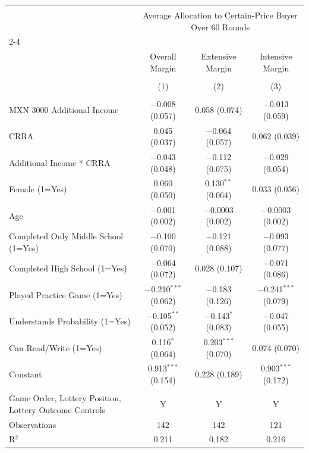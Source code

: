 
\begin{table}[!htbp] \centering 
   
   
\begin{tabular}{@{\extracolsep{5pt}}lccc} 
\\[-1.8ex]\hline 
\hline \\[-1.8ex] 
 & \multicolumn{3}{c}{Average Allocation to Certain-Price Buyer Over 60 Rounds} \\ 
\cline{2-4} 
\\[-1.8ex] & Overall Margin & Extensive Margin & Intensive Margin \\ 
\\[-1.8ex] & (1) & (2) & (3)\\ 
\hline \\[-1.8ex] 
 MXN 3000 Additional Income & $-$0.008 (0.057) & 0.058 (0.074) & $-$0.013 (0.059) \\ 
  CRRA & 0.045 (0.037) & $-$0.064 (0.057) & 0.062 (0.039) \\ 
  Additional Income * CRRA & $-$0.043 (0.048) & $-$0.112 (0.075) & $-$0.029 (0.054) \\ 
  Female (1=Yes) & 0.060 (0.050) & 0.130$^{**}$ (0.064) & 0.033 (0.056) \\ 
  Age & $-$0.001 (0.002) & $-$0.0003 (0.002) & $-$0.0003 (0.002) \\ 
  Completed Only Middle School (1=Yes) & $-$0.100 (0.070) & $-$0.121 (0.088) & $-$0.093 (0.077) \\ 
  Completed High School (1=Yes) & $-$0.064 (0.072) & 0.028 (0.107) & $-$0.071 (0.086) \\ 
  Played Practice Game (1=Yes) & $-$0.210$^{***}$ (0.062) & $-$0.183 (0.126) & $-$0.241$^{***}$ (0.079) \\ 
  Understands Probability (1=Yes) & $-$0.105$^{**}$ (0.052) & $-$0.143$^{*}$ (0.083) & $-$0.047 (0.055) \\ 
  Can Read/Write (1=Yes) & 0.116$^{*}$ (0.064) & 0.203$^{***}$ (0.070) & 0.074 (0.070) \\ 
  Constant & 0.913$^{***}$ (0.154) & 0.228 (0.189) & 0.903$^{***}$ (0.172) \\ 
 \hline \\[-1.8ex] 
Game Order, Lottery Position, Lottery Outcome Controls & Y & Y & Y \\ 
Observations & 142 & 142 & 121 \\ 
R$^{2}$ & 0.211 & 0.182 & 0.216 \\ 

\end{tabular}
\end{table}
